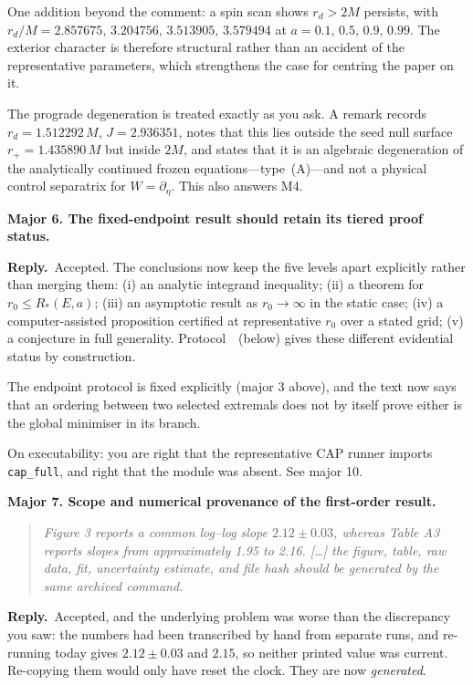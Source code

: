 \documentclass[11pt]{article}
\newenvironment{referee}
  {\begin{quote}\itshape\small}
  {\end{quote}}
\newcommand{\reply}{\par\noindent\textbf{Reply.}\ }
\newcommand{\R}[1]{\par\medskip\noindent\textbf{#1}\par\nopagebreak}
\begin{document}
One addition beyond the comment: a spin scan shows $r_d>2M$ persists, with
$r_d/M=2.857675,\,3.204756,\,3.513905,\,3.579494$ at $a=0.1,\,0.5,\,0.9,\,0.99$.
The exterior character is therefore structural rather than an accident of the
representative parameters, which strengthens the case for centring the paper on
it.

The prograde degeneration is treated exactly as you ask. A remark records
$r_d=1.512292\,M$, $J=2.936351$, notes that this lies outside the seed null
surface $r_+=1.435890\,M$ but inside $2M$, and states that it is an algebraic
degeneration of the analytically continued frozen equations---type~(A)---and not
a physical control separatrix for $W=\partial_\eta$. This also answers M4.

\R{Major 6. The fixed-endpoint result should retain its tiered proof status.}

\reply Accepted. The conclusions now keep the five levels apart explicitly
rather than merging them: (i) an analytic integrand inequality; (ii) a theorem
for $r_0\le R_*(E,a)$; (iii) an asymptotic result as $r_0\to\infty$ in the static
case; (iv) a computer-assisted proposition certified at representative $r_0$ over
a stated grid; (v) a conjecture in full generality. Protocol~\msProtEvidence\ (below) gives
these different evidential status by construction.

The endpoint protocol is fixed explicitly (major 3 above), and the text now says
that an ordering between two selected extremals does not by itself prove either
is the global minimiser in its branch.

On executability: you are right that the representative CAP runner imports
\texttt{cap\_full}, and right that the module was absent. See major 10.

\R{Major 7. Scope and numerical provenance of the first-order result.}

\begin{referee}
Figure 3 reports a common log--log slope $2.12\pm0.03$, whereas Table A3 reports
slopes from approximately 1.95 to 2.16. [\dots] the figure, table, raw data, fit,
uncertainty estimate, and file hash should be generated by the same archived
command.
\end{referee}

\reply Accepted, and the underlying problem was worse than the discrepancy you
saw: the numbers had been transcribed by hand from separate runs, and re-running
today gives $2.12\pm0.03$ and $2.15$, so neither printed value was current.
Re-copying them would only have reset the clock. They are now \emph{generated}.
\end{document}
